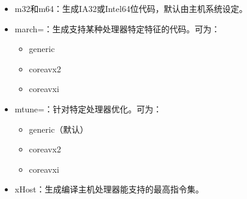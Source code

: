 \documentclass[a4paper,12pt,english]{sphinxmanual}
\begin{document}
\begin{itemize}
\begin{itemize}
\item {} 
\sphinxAtStartPar
sse：已过时，现在与ia32一样。

\item {} 
\sphinxAtStartPar
ia32：生成与IA\sphinxhyphen{}32架构兼容的x86/x87通用代码。取消任何默认扩展指令集，任何之前的扩展指令集。并且取消所有面向特征的优化及指令。此值仅在Linux系统上使用IA\sphinxhyphen{}32架构时有效。

\end{itemize}

\item {} 
\sphinxAtStartPar
\sphinxhyphen{}m32和\sphinxhyphen{}m64：生成IA\sphinxhyphen{}32或Intel64位代码，默认由主机系统设定。

\item {} 
\sphinxAtStartPar
\sphinxhyphen{}march=：生成支持某种处理器特定特征的代码。可为：
\begin{itemize}
\item {} 
\sphinxAtStartPar
generic

\item {} 
\sphinxAtStartPar
core\sphinxhyphen{}avx2

\item {} 
\sphinxAtStartPar
core\sphinxhyphen{}avx\sphinxhyphen{}i

\end{itemize}

\item {} 
\sphinxAtStartPar
\sphinxhyphen{}mtune=：针对特定处理器优化。可为：
\begin{itemize}
\item {} 
\sphinxAtStartPar
generic（默认）

\item {} 
\sphinxAtStartPar
core\sphinxhyphen{}avx2

\item {} 
\sphinxAtStartPar
core\sphinxhyphen{}avx\sphinxhyphen{}i

\end{itemize}

\item {} 
\sphinxAtStartPar
\sphinxhyphen{}xHost：生成编译主机处理器能支持的最高指令集。

\end{itemize}
\end{document}

